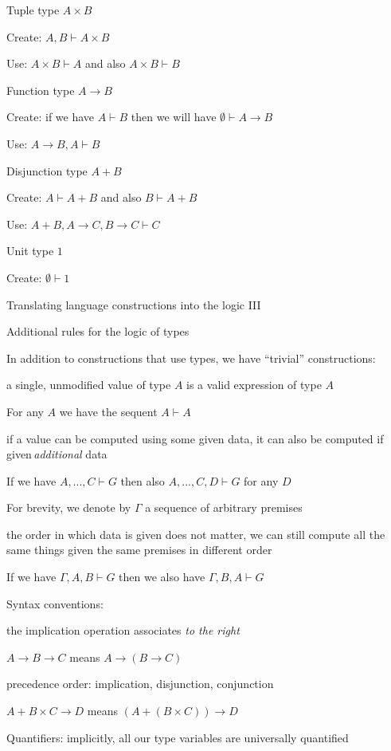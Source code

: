 Tuple type $A\times B$

Create: $A,B\vdash A\times B$ 

Use: $A\times B\vdash A$ and also $A\times B\vdash B$

Function type $A\rightarrow B$

Create: if we have $A\vdash B$ then we will have $\emptyset\vdash A\rightarrow B$ 

Use: $A\rightarrow B,A\vdash B$

Disjunction type $A+B$

Create: $A\vdash A+B$ and also $B\vdash A+B$

Use: $A+B,A\rightarrow C,B\rightarrow C\vdash C$

Unit type $1$

Create: $\emptyset\vdash1$

Translating language constructions into the logic III

Additional rules for the logic of types

In addition to constructions that use types, we have \textsf{``}trivial\textsf{''}
constructions:

a single, unmodified value of type $A$ is a valid expression of type
$A$

For any $A$ we have the sequent $A\vdash A$

if a value can be computed using some given data, it can also be computed
if given\,\emph{additional} data

If we have $A,...,C\vdash G$ then also $A,...,C,D\vdash G$ for any
$D$

For brevity, we denote by $\Gamma$ a sequence of arbitrary premises

the order in which data is given does not matter, we can still compute
all the same things given the same premises in different order

If we have $\Gamma,A,B\vdash G$ then we also have $\Gamma,B,A\vdash G$

Syntax conventions:

the implication operation associates \emph{to the right}

$A\rightarrow B\rightarrow C$ means $A\rightarrow\left(B\rightarrow C\right)$

precedence order: implication, disjunction, conjunction

$A+B\times C\rightarrow D$ means $\left(A+\left(B\times C\right)\right)\rightarrow D$

Quantifiers: implicitly, all our type variables are universally quantified

